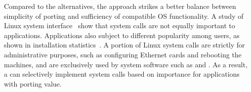 Compared to the alternatives,
the \libos{} approach strikes a better balance %
between simplicity of porting
and sufficiency of compatible OS functionality. %
A study of Linux system interface~\cite{tsai16apistudy}
show that system calls
are not equally important to applications.
Applications also
subject to different popularity among users, as shown in
installation statistics~\cite{ubuntu-popularity}.
A portion of Linux system calls are strictly for administrative purposes,
such as configuring Ethernet cards and rebooting the machines,
and are 
exclusively used by
system software such as  and .
As a result, a \libos{} can selectively implement
system calls
based on importance for applications
with porting value.













